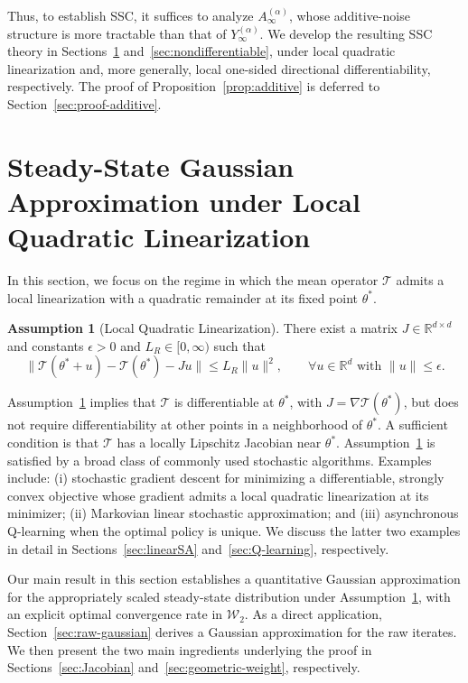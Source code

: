 \documentclass[11pt,letterpaper]{article}
\theoremstyle{plain}
\theoremstyle{definition}
\newtheorem{assumption}{Assumption}
\theoremstyle{remark}
\newcommand{\mT}{\mathcal{T}}
\newcommand{\R}{\mathbb{R}}
\newcommand{\W}{\mathcal{W}}
\begin{document}
Thus, to establish SSC, it suffices to analyze
\(A_\infty^{(\alpha)}\), whose additive-noise structure is more tractable than
that of \(Y_\infty^{(\alpha)}\). We develop the resulting SSC theory in
Sections~\ref{sec:differentiable} and~\ref{sec:nondifferentiable}, under
local quadratic linearization and, more generally, local one-sided
directional differentiability, respectively. The proof of
Proposition~\ref{prop:additive} is deferred to
Section~\ref{sec:proof-additive}.


\section{Steady-State Gaussian Approximation under Local Quadratic Linearization}
\label{sec:differentiable}

In this section, we focus on the regime in which the mean operator
\(\mT\) admits a local linearization with a quadratic remainder at its fixed
point \(\theta^*\).


\begin{assumption}[Local Quadratic Linearization]
\label{assumption:local-quadratic}
There exist a matrix \(J\in\R^{d\times d}\) and constants
\(\epsilon>0\) and \(L_R\in[0,\infty)\) such that
\[
    \bigl\|
        \mT(\theta^*+u)-\mT(\theta^*)-Ju
    \bigr\|
    \leq L_R\|u\|^2,
    \qquad
    \forall u\in\R^d\text{ with }\|u\|\leq\epsilon.
\]
\end{assumption}

Assumption~\ref{assumption:local-quadratic} implies that \(\mT\) is differentiable
at \(\theta^*\), with \(J=\nabla\mT(\theta^*)\), but does not require
differentiability at other points in a neighborhood of \(\theta^*\).
A sufficient condition is that \(\mT\) has a locally Lipschitz Jacobian
near \(\theta^*\). Assumption~\ref{assumption:local-quadratic} is satisfied by a broad class of
commonly used stochastic algorithms. Examples include:
(i) stochastic gradient descent for minimizing a differentiable, strongly convex
objective whose gradient admits a local quadratic linearization at its minimizer;
(ii) Markovian linear stochastic approximation; and
(iii) asynchronous Q-learning when the optimal policy is unique.
We discuss the latter two examples in detail in
Sections~\ref{sec:linearSA} and~\ref{sec:Q-learning}, respectively.

Our main result in this section establishes a quantitative Gaussian
approximation for the appropriately scaled steady-state distribution under
Assumption~\ref{assumption:local-quadratic}, with an explicit optimal convergence rate
in \(\W_2\). As a direct application, Section~\ref{sec:raw-gaussian} derives a
Gaussian approximation for the raw iterates. We then present the two
main ingredients underlying the proof in
Sections~\ref{sec:Jacobian} and~\ref{sec:geometric-weight}, respectively.
\end{document}
